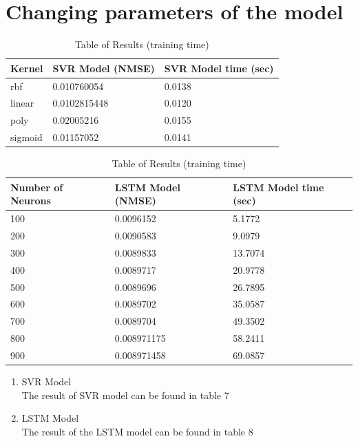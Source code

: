 \documentclass{article}
\begin{document}
\section{Changing parameters of the model}

\begin{table}[htb!]
	\centering
	\begin{tabular}{p{2cm} p{2cm} p{2cm}}
		\toprule
		Kernel & SVR Model (NMSE) & SVR Model time (sec)  \\
		\midrule
		rbf & 0.010760054 & 0.0138 \\
		\midrule
		linear & 0.0102815448 & 0.0120 \\
		\midrule
		poly & 0.02005216 & 0.0155 \\
		\midrule
		sigmoid & 0.01157052 & 0.0141 \\
		\bottomrule
	\end{tabular}
	\caption{Table of Results (training time)}
\end{table}

\begin{table}[htb!]
	\centering
	\begin{tabular}{p{2cm} p{2cm} p{2cm}}
		\toprule
		Number of Neurons & LSTM Model (NMSE) & LSTM Model time (sec)  \\
		\midrule
		100 & 0.0096152 & 5.1772 \\
		\midrule
		200 & 0.0090583 & 9.0979 \\
		\midrule
		300 & 0.0089833 & 13.7074 \\
		\midrule
		400 & 0.0089717 & 20.9778 \\
		\midrule
		500 & 0.0089696 & 26.7895 \\
		\midrule
		600 & 0.0089702 & 35.0587 \\
		\midrule
		700 & 0.0089704 & 49.3502 \\
		\midrule
		800 & 0.008971175 & 58.2411 \\
		\midrule
		900 & 0.008971458 & 69.0857 \\
		\bottomrule
	\end{tabular}
	\caption{Table of Results (training time)}
\end{table}

\begin{enumerate}
	\item SVR Model \\
		The result of SVR model can be found in table 7
	\item LSTM Model \\
		The result of the LSTM model can be found in table 8
\end{enumerate}
\end{document}
